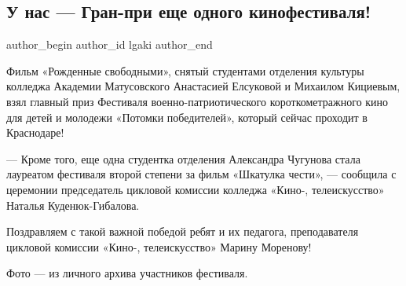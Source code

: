  
 
 
 
 
\subsection{У нас — Гран-при еще одного кинофестиваля!}
\label{sec:11_12_2021.stz.edu.lnr.lgaki.1.granpri}

\ifcmt
 author_begin
   author_id lgaki
 author_end
\fi

Фильм «Рожденные свободными», снятый студентами отделения культуры колледжа
Академии Матусовского Анастасией Елсуковой и Михаилом Кициевым, взял главный
приз Фестиваля военно-патриотического короткометражного кино для детей и
молодежи «Потомки победителей», который сейчас проходит в Краснодаре!


— Кроме того, еще одна студентка отделения Александра Чугунова стала лауреатом
фестиваля второй степени за фильм «Шкатулка чести», — сообщила с церемонии
председатель цикловой комиссии колледжа «Кино-, телеискусство» Наталья
Куденюк-Гибалова.

Поздравляем с такой важной победой ребят и их педагога, преподавателя цикловой
комиссии «Кино-, телеискусство» Марину Моренову!

Фото — из личного архива участников фестиваля.
